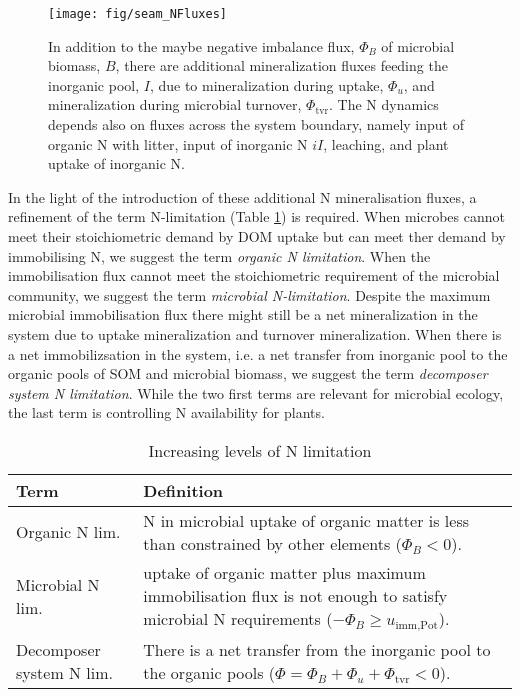 \begin{figure}[t] \vspace*{2mm}
\begin{center}
\texttt{[image: fig/seam\_NFluxes]} 
\end{center}
\caption{
In addition to the maybe negative imbalance flux, $\Phi_B$ of microbial biomass,
$B$, there are additional mineralization fluxes feeding the inorganic pool, $I$,
due to mineralization during uptake, $\Phi_u$, and mineralization during
microbial turnover, $\Phi_{\operatorname{tvr}}$. The N dynamics depends also on
fluxes across the system boundary, namely input of organic N with litter, input
of inorganic N $iI$, leaching, and plant uptake of inorganic N.
\label{fig:SEAMStructNFluxes}}
\end{figure}

In the light of the introduction of these additional N mineralisation fluxes, a
refinement of the term N-limitation (Table
\ref{tab:NutrientLimDefs}) is required.
When microbes cannot meet their stoichiometric demand by DOM uptake but can
meet ther demand by immobilising N, we suggest the term 
\textit{organic N limitation}.
When the immobilisation flux cannot meet the stoichiometric requirement of the
microbial community, we suggest the term \textit{microbial N-limitation}.
Despite the maximum microbial immobilisation flux there might still be a net
mineralization in the system due to uptake mineralization and turnover
mineralization. When there is a net
immobilizsation in the system, i.e. a net transfer from inorganic pool to the
organic pools of SOM and microbial biomass, we suggest the term 
\textit{decomposer system N limitation}. While the two first terms are relevant
for microbial ecology, the last term is controlling N availability for plants.

\begin{table}[t]
\caption{Increasing levels of N limitation \label{tab:NutrientLimDefs}}
\centering
\begin{tabular}{p{2.3cm}p{5.5cm}}
\hline
Term &  Definition \\
\hline
Organic N lim. & N in microbial uptake of organic matter is less than 
constrained by other elements (${\Phi_B < 0}$).
\\
Microbial N lim. & uptake of organic matter plus maximum immobilisation flux is
not enough to satisfy microbial N requirements (${-\Phi_B \ge
u_{\operatorname{imm,Pot}}}$).
\\
Decomposer system N lim. & There is a net transfer from the inorganic pool to
the organic pools (${\Phi = \Phi_B+\Phi_u+\Phi_{\operatorname{tvr}}<0}$).
\\
\hline
\end{tabular}
\end{table}
 
